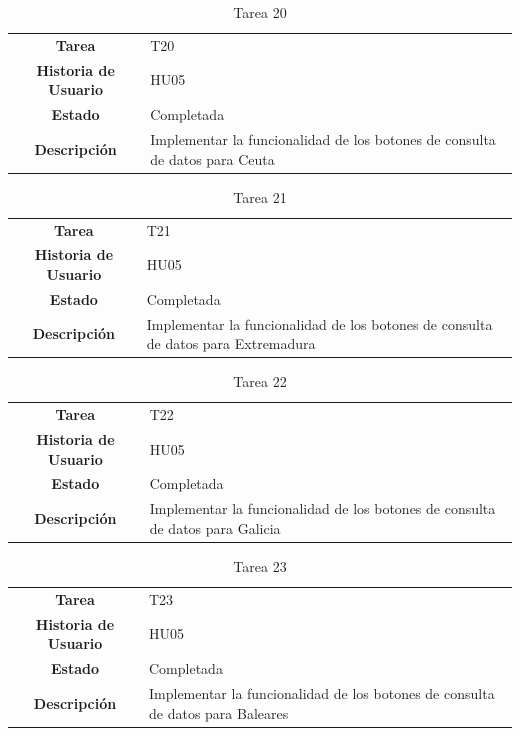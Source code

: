 \begin{table}[H]
	\begin{center}
		\begin{tabular}{| c | p{9cm} |}
			\hline
			
			\textbf{Tarea} & T20 \\
			\textbf{Historia de Usuario} & HU05 \\
			\textbf{Estado} & Completada \\
			\textbf{Descripción} & Implementar la funcionalidad de los botones de consulta de datos para Ceuta \\ \hline
		\end{tabular}
		\caption{Tarea 20}
	\end{center}
\end{table}

\begin{table}[H]
	\begin{center}
		\begin{tabular}{| c | p{9cm} |}
			\hline
			
			\textbf{Tarea} & T21 \\
			\textbf{Historia de Usuario} & HU05 \\
			\textbf{Estado} & Completada \\
			\textbf{Descripción} & Implementar la funcionalidad de los botones de consulta de datos para Extremadura \\ \hline
		\end{tabular}
		\caption{Tarea 21}
	\end{center}
\end{table}

\begin{table}[H]
	\begin{center}
		\begin{tabular}{| c | p{9cm} |}
			\hline
			
			\textbf{Tarea} & T22 \\
			\textbf{Historia de Usuario} & HU05 \\
			\textbf{Estado} & Completada \\
			\textbf{Descripción} & Implementar la funcionalidad de los botones de consulta de datos para Galicia \\ \hline
		\end{tabular}
		\caption{Tarea 22}
	\end{center}
\end{table}

\begin{table}[H]
	\begin{center}
		\begin{tabular}{| c | p{9cm} |}
			\hline
			
			\textbf{Tarea} & T23 \\
			\textbf{Historia de Usuario} & HU05 \\
			\textbf{Estado} & Completada \\
			\textbf{Descripción} & Implementar la funcionalidad de los botones de consulta de datos para Baleares \\ \hline
		\end{tabular}
		\caption{Tarea 23}
	\end{center}
\end{table}

